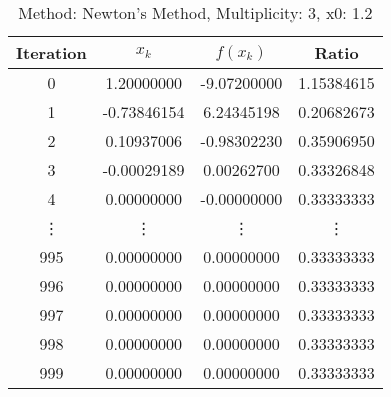 \begin{table}
\centering
\caption{Method: Newton's Method, Multiplicity: 3, x0: 1.2}
\label{tab:table_Newton's_Method_3_1_2}
\begin{tabular}{c c c c}
\toprule
Iteration &       $x_k$ &    $f(x_k)$ &      Ratio \\
\midrule
        0 &  1.20000000 & -9.07200000 & 1.15384615 \\
        1 & -0.73846154 &  6.24345198 & 0.20682673 \\
        2 &  0.10937006 & -0.98302230 & 0.35906950 \\
        3 & -0.00029189 &  0.00262700 & 0.33326848 \\
        4 &  0.00000000 & -0.00000000 & 0.33333333 \\
   \vdots &      \vdots &      \vdots &     \vdots \\
      995 &  0.00000000 &  0.00000000 & 0.33333333 \\
      996 &  0.00000000 &  0.00000000 & 0.33333333 \\
      997 &  0.00000000 &  0.00000000 & 0.33333333 \\
      998 &  0.00000000 &  0.00000000 & 0.33333333 \\
      999 &  0.00000000 &  0.00000000 & 0.33333333 \\
\bottomrule
\end{tabular}
\end{table}
